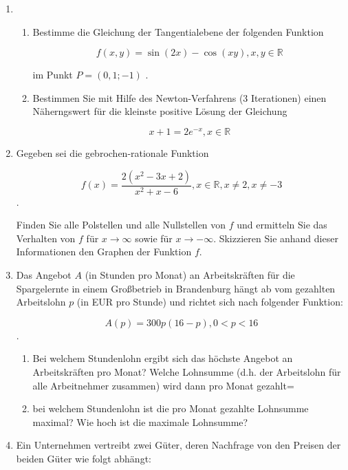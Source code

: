 \documentclass[12pt,a4paper]{scrreprt}
\newcommand{\R}{\mathds{R}}
\begin{document}

\begin{enumerate}

\item %

\begin{enumerate}

\item
Bestimme die Gleichung der Tangentialebene der folgenden Funktion

\[
f(x, y) = \sin(2x) - \cos(xy), x,y \in \R
\]

im Punkt $P=(0,1; -1)$ .

\item %
Bestimmen Sie mit Hilfe des Newton-Verfahrens (3 Iterationen) einen Näherngswert für die kleinste positive Lösung der Gleichung

\[
x+1 = 2e^{-x}, x \in \R
\]

\end{enumerate}

\item %
Gegeben sei die gebrochen-rationale Funktion

\[
f(x) = \frac{2(x^2-3x+2)}{x^2+x-6}, x \in \R, x \neq 2, x \neq -3
\].

Finden Sie alle Polstellen und alle Nullstellen von $f$ und ermitteln Sie das Verhalten von $f$ für $x \rightarrow \infty$
sowie für $x \rightarrow -\infty$. Skizzieren Sie anhand dieser Informationen den Graphen der Funktion $f$.

\item %
Das Angebot $A$ (in Stunden pro Monat) an Arbeitskräften für die Spargelernte in einem Großbetrieb in
Brandenburg hängt ab vom gezahlten Arbeitslohn $p$ (in EUR pro Stunde) und richtet sich nach folgender Funktion:

\[
A(p) = 300p(16-p), 0<p<16
\].

\begin{enumerate}
\item Bei welchem Stundenlohn ergibt sich das höchste Angebot an Arbeitskräften pro Monat?
Welche Lohnsumme (d.h. der Arbeitslohn für alle Arbeitnehmer zusammen) wird dann pro Monat gezahlt=
\item bei welchem Stundenlohn ist die pro Monat gezahlte Lohnsumme maximal? Wie hoch ist die maximale Lohnsumme?
\end{enumerate}

\item %
Ein Unternehmen vertreibt zwei Güter, deren Nachfrage von den Preisen der beiden Güter wie folgt abhängt:


\end{enumerate}
\end{document}
